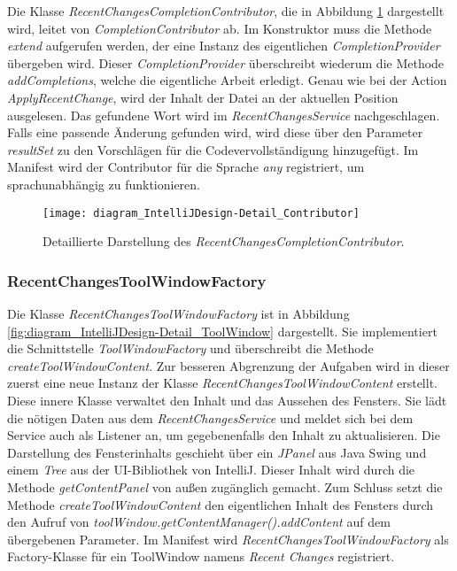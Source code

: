 Die Klasse \emph{RecentChangesCompletionContributor}, die in Abbildung
\ref{fig:diagram_IntelliJDesign-Detail_Contributor} dargestellt wird,
leitet von \emph{CompletionContributor} ab. Im Konstruktor muss
die Methode \emph{extend} aufgerufen werden, der eine Instanz 
des eigentlichen \emph{CompletionProvider} übergeben wird.
Dieser \emph{CompletionProvider} überschreibt wiederum die 
Methode \emph{addCompletions}, welche die eigentliche Arbeit erledigt.
Genau wie bei der Action \emph{ApplyRecentChange}, wird der
Inhalt der Datei an der aktuellen Position ausgelesen. Das gefundene
Wort wird im \emph{RecentChangesService} nachgeschlagen.
Falls eine passende Änderung gefunden wird, wird diese über den 
Parameter \emph{resultSet} zu den Vorschlägen für die Codevervollständigung
hinzugefügt.
Im Manifest wird der Contributor für die Sprache \emph{any} registriert,
um sprachunabhängig zu funktionieren.

\begin{figure}
    \centering
    \texttt{[image: diagram\_IntelliJDesign-Detail\_Contributor]}
    \caption{Detaillierte Darstellung des \emph{RecentChangesCompletionContributor}.}
    \label{fig:diagram_IntelliJDesign-Detail_Contributor}
\end{figure}

\subsubsection{RecentChangesToolWindowFactory}

Die Klasse \emph{RecentChangesToolWindowFactory} ist in Abbildung
\ref{fig:diagram_IntelliJDesign-Detail_ToolWindow} dargestellt.
Sie implementiert die Schnittstelle \emph{ToolWindowFactory} 
und überschreibt die Methode \emph{createToolWindowContent}. Zur besseren 
Abgrenzung der Aufgaben wird in dieser zuerst eine neue Instanz
der Klasse \emph{RecentChangesToolWindowContent} erstellt.
Diese innere Klasse verwaltet den Inhalt und das Aussehen des Fensters.
Sie lädt die nötigen Daten aus dem \emph{RecentChangesService} und
meldet sich bei dem Service auch als Listener an, um gegebenenfalls den
Inhalt zu aktualisieren. Die Darstellung des Fensterinhalts
geschieht über ein \emph{JPanel} aus Java Swing und einem \emph{Tree}
aus der UI-Bibliothek von IntelliJ. Dieser Inhalt wird
durch die Methode \emph{getContentPanel} von außen zugänglich gemacht.
Zum Schluss setzt die Methode \emph{createToolWindowContent} 
den eigentlichen Inhalt des Fensters durch den Aufruf von
\emph{toolWindow.getContentManager().addContent} auf dem übergebenen
Parameter.
Im Manifest wird \emph{RecentChangesToolWindowFactory} als Factory-Klasse
für ein ToolWindow namens \emph{Recent Changes} registriert.

